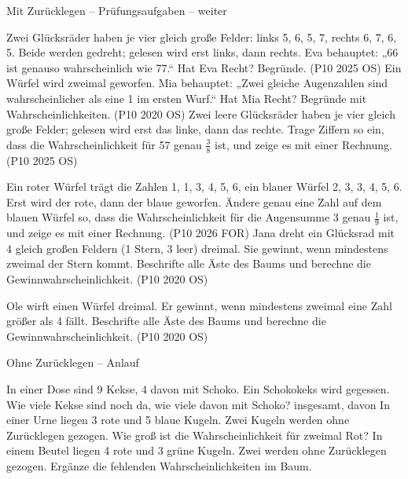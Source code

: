 \begin{aufgabe}{Mit Zurücklegen – Prüfungsaufgaben – weiter}
\begin{teile}
\teil Zwei Glücksräder haben je vier gleich große Felder: links 5, 6, 5, 7, rechts 6, 7, 6, 5. Beide werden gedreht; gelesen wird erst links, dann rechts. Eva behauptet: „66 ist genauso wahrscheinlich wie 77.“ Hat Eva Recht? Begründe. \hfill (P10 2025 OS)
\teil Ein Würfel wird zweimal geworfen. Mia behauptet: „Zwei gleiche Augenzahlen sind wahrscheinlicher als eine 1 im ersten Wurf.“ Hat Mia Recht? Begründe mit Wahrscheinlichkeiten. \hfill (P10 2020 OS)
\steil Zwei leere Glücksräder haben je vier gleich große Felder; gelesen wird erst das linke, dann das rechte. Trage Ziffern so ein, dass die Wahrscheinlichkeit für 57 genau $\frac{3}{8}$ ist, und zeige es mit einer Rechnung. \hfill (P10 2025 OS)

 
\teil Ein roter Würfel trägt die Zahlen 1, 1, 3, 4, 5, 6, ein blauer Würfel 2, 3, 3, 4, 5, 6. Erst wird der rote, dann der blaue geworfen. Ändere genau eine Zahl auf dem blauen Würfel so, dass die Wahrscheinlichkeit für die Augensumme 3 genau $\frac{1}{9}$ ist, und zeige es mit einer Rechnung. \hfill (P10 2026 FOR)
\steil Jana dreht ein Glücksrad mit 4 gleich großen Feldern (1 Stern, 3 leer) dreimal. Sie gewinnt, wenn mindestens zweimal der Stern kommt. Beschrifte alle Äste des Baums und berechne die Gewinnwahrscheinlichkeit. \hfill (P10 2020 OS)

\steil Ole wirft einen Würfel dreimal. Er gewinnt, wenn mindestens zweimal eine Zahl größer als 4 fällt. Beschrifte alle Äste des Baums und berechne die Gewinnwahrscheinlichkeit. \hfill (P10 2020 OS)

\end{teile}
\end{aufgabe}

\begin{aufgabe}{Ohne Zurücklegen – Anlauf}
\begin{teile}
\teil In einer Dose sind 9 Kekse, 4 davon mit Schoko. Ein Schokokeks wird gegessen. Wie viele Kekse sind noch da, wie viele davon mit Schoko? \leerfeld insgesamt, davon \leerfeld
\teil In einer Urne liegen 3 rote und 5 blaue Kugeln. Zwei Kugeln werden ohne Zurücklegen gezogen. Wie groß ist die Wahrscheinlichkeit für zweimal Rot?
\teil In einem Beutel liegen 4 rote und 3 grüne Kugeln. Zwei werden ohne Zurücklegen gezogen. Ergänze die fehlenden Wahrscheinlichkeiten im Baum.

\end{teile}
\end{aufgabe}

